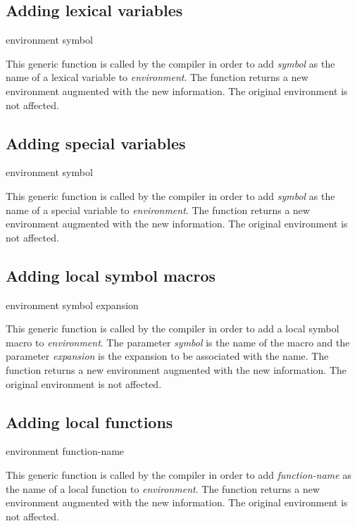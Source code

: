 \subsection{Adding lexical variables}

 {environment symbol}

This generic function is called by the compiler in order to add
\textit{symbol} as the name of a lexical variable to
\textit{environment}.  The function returns a new environment
augmented with the new information.  The original environment is not
affected.

\subsection{Adding special variables}

 {environment symbol}

This generic function is called by the compiler in order to add
\textit{symbol} as the name of a special variable to
\textit{environment}.  The function returns a new environment
augmented with the new information.  The original environment is not
affected.

\subsection{Adding local symbol macros}

 {environment symbol expansion}

This generic function is called by the compiler in order to add a
local symbol macro to \textit{environment}.  The parameter
\textit{symbol} is the name of the macro and the parameter
\textit{expansion} is the expansion to be associated with the name.
The function returns a new environment augmented with the new
information.  The original environment is not affected.

\subsection{Adding local functions}

 {environment function-name}

This generic function is called by the compiler in order to add
\textit{function-name} as the name of a local function to
\textit{environment}.  The function returns a new environment
augmented with the new information.  The original environment is not
affected.


